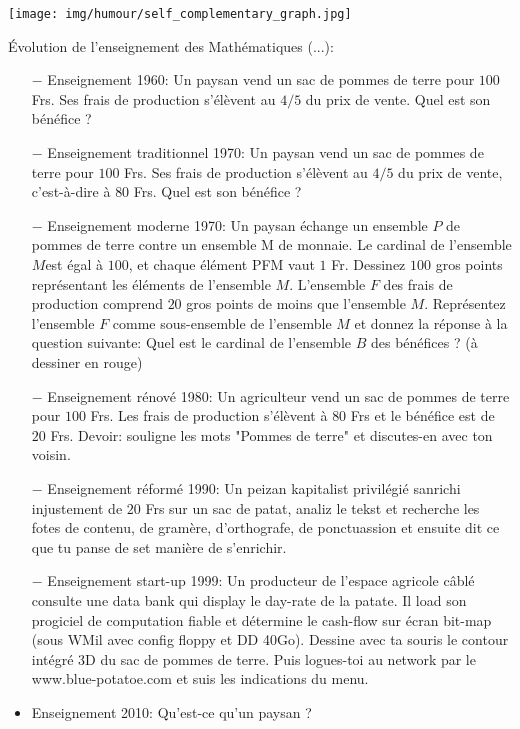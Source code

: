 	\begin{center}\underline{\hspace{5 cm}}\end{center}
	
	\begin{center}
		\texttt{[image: img/humour/self\_complementary\_graph.jpg]}	
	\end{center}
	
	\pagebreak
Évolution de l'enseignement des Mathématiques (...):

\begin{itemize}	 
	\item[$-$] Enseignement 1960: Un paysan vend un sac de pommes de terre pour $100$ Frs. Ses frais de production s'élèvent au $4/5$ du prix de vente. Quel est son bénéfice ?

	\item[$-$] Enseignement traditionnel 1970: Un paysan vend un sac de pommes de terre pour $100$ Frs. Ses frais de production s'élèvent au $4/5$ du prix de vente, c'est-à-dire à $80$ Frs. Quel est son bénéfice ?

	\item[$-$] Enseignement moderne 1970: Un paysan échange un ensemble $P$ de pommes de terre contre un ensemble M de monnaie. Le cardinal de l'ensemble $M $est égal à $100$, et chaque élément PFM vaut $1$ Fr. Dessinez $100$ gros points représentant les éléments de l'ensemble $M$. L'ensemble $F$ des frais de production comprend $20$ gros points de moins que l'ensemble $M$. Représentez l'ensemble $F$ comme sous-ensemble de l'ensemble $M$ et donnez la réponse à la question suivante: Quel est le cardinal de l'ensemble $B$ des bénéfices ? (à dessiner en rouge)

	\item[$-$] Enseignement rénové 1980: Un agriculteur vend un sac de pommes de terre pour $100$ Frs. Les frais de production s'élèvent à $80$ Frs et le bénéfice est de $20$ Frs. Devoir: souligne les mots "Pommes de terre" et discutes-en avec ton voisin.

	\item[$-$] Enseignement réformé 1990: Un peizan kapitalist privilégié sanrichi injustement de $20$ Frs sur un sac de patat, analiz le tekst et recherche les fotes de contenu, de gramère, d'orthografe, de ponctuassion et ensuite dit ce que tu panse de set manière de s'enrichir.

	\item[$-$] Enseignement start-up 1999: Un producteur de l'espace agricole câblé consulte une data bank qui display le day-rate de la patate. Il load son progiciel de computation fiable et détermine le cash-flow sur écran bit-map (sous WMil avec config floppy et DD 40Go). Dessine avec ta souris le contour intégré 3D du sac de pommes de terre. Puis logues-toi au network par le www.blue-potatoe.com et suis les indications du menu.
	
	\item Enseignement 2010: Qu'est-ce qu'un paysan ?

\end{itemize}
